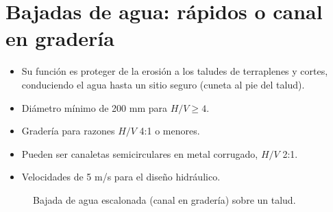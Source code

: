 \section{Bajadas de agua: rápidos o canal en gradería}
\begin{itemize}
  \item Su función es proteger de la erosión a los taludes de terraplenes y
        cortes, conduciendo el agua hasta un sitio seguro (cuneta al pie del talud).
  \item Diámetro mínimo de 200 mm para $H/V\geq4$.
  \item Gradería para razones $H/V$ 4:1 o menores.
  \item Pueden ser canaletas semicirculares en metal corrugado, $H/V$ 2:1.
  \item Velocidades de 5 m/s para el diseño hidráulico.
\end{itemize}

\begin{figure}[H]
\centering
{}
\caption{Bajada de agua escalonada (canal en gradería) sobre un talud.}
\end{figure}
